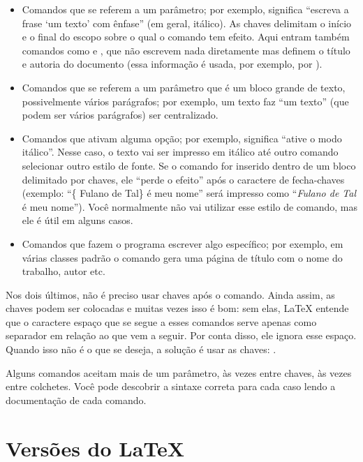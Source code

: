 \begin{itemize}
\item Comandos que se referem a um parâmetro; por exemplo,
 significa ``escreva a frase
`um texto' com ênfase'' (em geral, itálico). As chaves delimitam o início
e o final do escopo sobre o qual o comando tem efeito. Aqui entram também
comandos como  e ,
que não escrevem nada diretamente mas definem o título e autoria do documento
(essa informação é usada, por exemplo, por ).

\item Comandos que se referem a um parâmetro que é um bloco grande de
texto, possivelmente vários parágrafos; por exemplo, 
um texto  faz ``um texto'' (que podem ser vários
parágrafos) ser centralizado.

\item Comandos que ativam alguma opção; por exemplo, 
significa ``ative o modo itálico''. Nesse caso, o texto vai ser impresso
em itálico até outro comando selecionar outro estilo de fonte. Se o comando
for inserido dentro de um bloco delimitado por chaves, ele ``perde o
efeito'' após o caractere de fecha-chaves (exemplo: ``\{
Fulano de Tal\} é meu nome'' será impresso como ``\textit{Fulano de Tal} é
meu nome''). Você normalmente não vai utilizar esse estilo de comando, mas
ele é útil em alguns casos.

\item Comandos que fazem o programa escrever algo específico; por exemplo,
em várias classes padrão o comando  gera
uma página de título com o nome do trabalho, autor etc.
\end{itemize}

Nos dois últimos, não é preciso usar chaves após o comando. Ainda assim, as
chaves podem ser colocadas e muitas vezes isso é bom: sem elas, \LaTeX{}
entende que o caractere espaço que se segue a esses comandos serve apenas
como separador em relação ao que vem a seguir. Por conta disso, ele ignora
esse espaço. Quando isso não é o que se deseja, a solução é usar as chaves:
.

Alguns comandos aceitam mais de um parâmetro, às vezes entre chaves, às
vezes entre colchetes. Você pode descobrir a sintaxe correta para cada caso
lendo a documentação de cada comando.

\section{Versões do \LaTeX{}}

